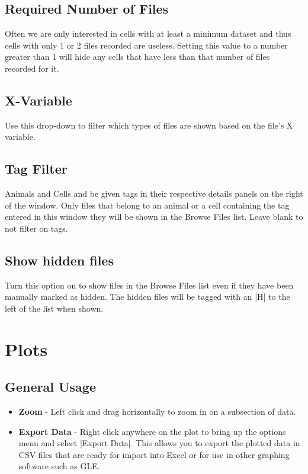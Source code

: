 \documentclass{report}
\begin{document}
\subsection{Required Number of Files}
Often we are only interested in cells with at least a minimum dataset and thus cells with only 1 or 2 files recorded are useless. Setting this value to a number greater than 1 will hide any cells that have less than that number of files recorded for it.

\subsection{X-Variable}
Use this drop-down to filter which types of files are shown based on the file's X variable.

\subsection{Tag Filter}
Animals and Cells and be given tags in their respective details panels on the right of the window. Only files that belong to an animal or a cell containing the tag entered in this window they will be shown in the Browse Files list. Leave blank to not filter on tags.

\subsection{Show hidden files}
Turn this option on to show files in the Browse Files list even if they have been manually marked as hidden. The hidden files will be tagged with an |H| to the left of the list when shown.

\section{Plots}
\subsection{General Usage}
\begin{itemize}
	\item \textbf{Zoom} - Left click and drag horizontally to zoom in on a subsection of data.  
	\item \textbf{Export Data} - Right click anywhere on the plot to bring up the options menu and select |Export Data|. This allows you to export the plotted data in CSV files that are ready for import into Excel or for use in other graphing software such as GLE.
\end{itemize}
\end{document}
